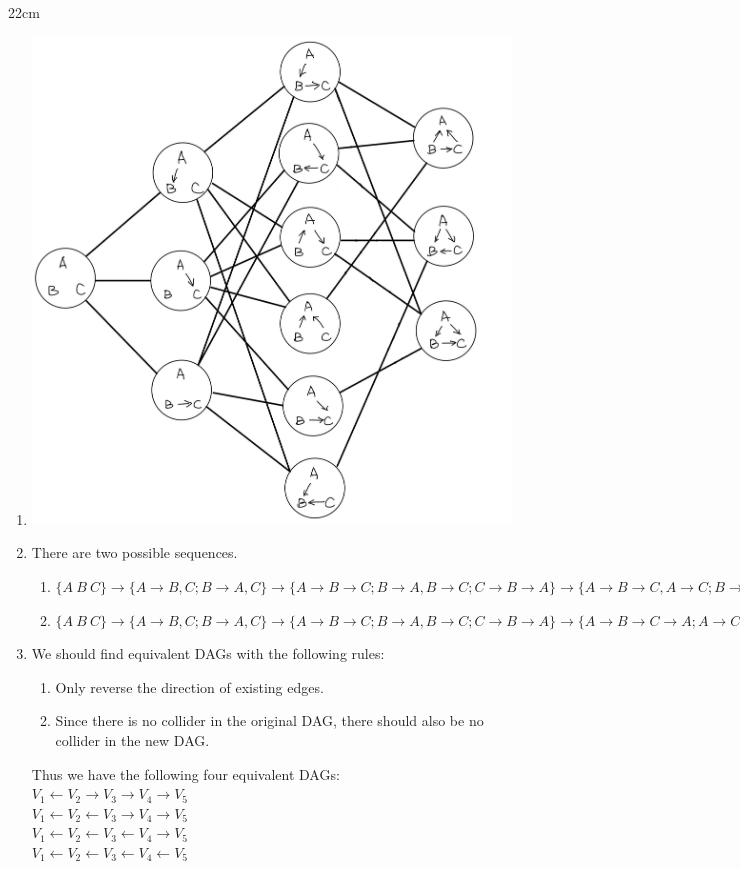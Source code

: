 \documentclass[11pt]{article}
\begin{document}
\begin{answertext}{22cm}{}
\begin{enumerate}
\item[(c)]
\includegraphics[scale=0.12]{graph}
\item[(d)]
There are two possible sequences.
\begin{enumerate}
\item[(1)]
$\{A\ B\ C\} \to \{A \to B, C; B \to A, C\} \to \{A \to B \to C; B \to A, B \to C; C \to B \to A\} \to \{A \to B \to C, A \to C; B \to A \to C, B \to C\} \to \{B \to A \to C; A \to B, A \to C; C \to A \to B\}$
\item[(2)]
$\{A\ B\ C\} \to \{A \to B, C; B \to A, C\} \to \{A \to B \to C; B \to A, B \to C; C \to B \to A\} \to \{A \to B \to C \to A; A \to C \to B \to A\} \to \{B \to A \to C; A \to B, A \to C; C \to A \to B\}$
\end{enumerate}
\item[(e)]
We should find equivalent DAGs with the following rules:
\begin{enumerate}
\item[(1)] Only reverse the direction of existing edges.
\item[(2)] Since there is no collider in the original DAG, there should also be no collider in the new DAG.
\end{enumerate}
Thus we have the following four equivalent DAGs: \\
$V_{1} \leftarrow V_{2} \to V_{3} \to V_{4} \to V_{5}$ \\
$V_{1} \leftarrow V_{2} \leftarrow V_{3} \to V_{4} \to V_{5}$ \\
$V_{1} \leftarrow V_{2} \leftarrow V_{3} \leftarrow V_{4} \to V_{5}$ \\
$V_{1} \leftarrow V_{2} \leftarrow V_{3} \leftarrow V_{4} \leftarrow V_{5}$ \\
\end{enumerate}
\end{answertext}
\end{document}
